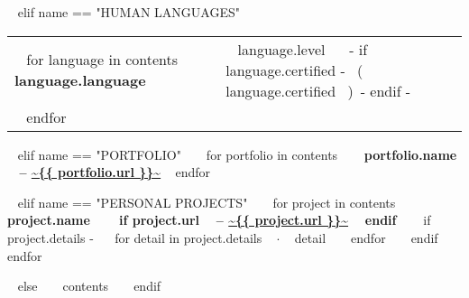 \begin{minipage}{\textwidth}

~{ elif name == "HUMAN LANGUAGES" }~
  \begin{tabular}{ @{} p{32mm} p{135mm} @{} }
  ~{ for language in contents }~
    \bf {~{{ language.language }}~} & {\small ~{{ language.level }}~ ~{- if language.certified -}~ \small\color{maingrey}\hspace{1mm}(~{{ language.certified }}~)~{- endif -}~} \\
  ~{ endfor }~
  \end{tabular}
  \vspace{50mm}


~{ elif name == "PORTFOLIO" }~
  ~{ for portfolio in contents }~
    {\bf ~{{ portfolio.name }}~ -- \color{maincolor}\url{~{{ portfolio.url }}~} }
    \vspace{1mm}
  ~{ endfor }~
  \vspace{5mm}


~{ elif name == "PERSONAL PROJECTS" }~
  ~{ for project in contents }~
    {\small\bf ~{{ project.name }}~ ~{ if project.url }~ -- \color{maincolor}\url{~{{ project.url }}~} ~{ endif }~ }
    \vspace{1mm}
    ~{ if project.details -}~
    ~{ for detail in project.details }~
      $\cdot$ \small ~{{ detail }}~
    ~{ endfor }~
    ~{ endif }~
    \vspace{3mm}
  ~{ endfor }~
  \vspace{15mm}


\vspace{10mm}
~{ else }~
  ~{{ contents }}~
  \bigskip
~{ endif }~
\end{minipage}


